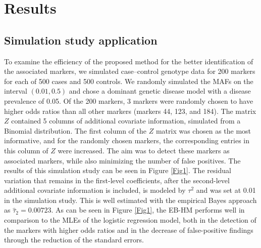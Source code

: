 \section{Results}
\label{sec3}

\subsection{Simulation study application}

To examine the efficiency of the proposed method for the better
identification of the associated markers, we simulated
case--control genotype data for 200 markers for each of 500
cases and 500 controls. We randomly simulated the MAFs on the
interval $(0.01, 0.5)$ and chose a dominant genetic disease
model with a disease prevalence of 0.05. Of the 200 markers,
3 markers were randomly chosen to have higher odds ratios
than all other markers (markers 44, 123, and 184). The matrix
$Z$ contained 5 columns of additional covariate information,
simulated from a Binomial distribution. The first column of
the $Z$ matrix was chosen as the most informative, and for
the randomly chosen markers, the corresponding entries in
this column of $Z$ were increased. The aim was to detect these
markers as associated markers, while also minimizing the
number of false positives. The results of this simulation
study can be seen in Figure \ref{Fig1}. The residual variation
that remains in the first-level coefficients, after the
second-level additional covariate information is included, is
modeled by $\tau^2$ and was set at 0.01 in the simulation
study. This is well estimated with the empirical Bayes approach
as $\hat{\tau}_2 = 0.00723$. As can be seen in Figure \ref{Fig1},
the EB-HM performs well in comparison to the MLEs of the
logistic regression model, both in the detection of the
markers with higher odds ratios and in the decrease of
false-positive findings through the reduction of the
standard errors.

